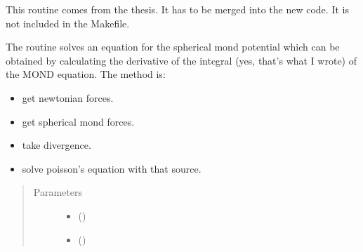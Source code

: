 \documentclass[letterpaper,10pt,english]{sphinxmanual}
\begin{document}
\begin{fulllineitems}
\label{\detokenize{sphinx-c-apidoc/output/gravity/mond_mass/solve_spherical_mond_c:c.pow6}}%
\pysigstartmultiline
{}%
\pysigstopmultiline
\end{fulllineitems}


\begin{fulllineitems}
\label{\detokenize{sphinx-c-apidoc/output/gravity/mond_mass/solve_spherical_mond_c:c.solve_spherical_mond}}%
\pysigstartmultiline
{}%
\pysigstopmultiline
This routine comes from the thesis.  It has to be merged into the new
code.  It is not included in the Makefile.

The routine solves an equation for the spherical mond potential which can
be obtained by calculating the derivative of the integral (yes, that’s
what I wrote) of the MOND equation.
The method is:
\begin{itemize}
\item {} 
get newtonian forces.

\item {} 
get spherical mond forces.

\item {} 
take divergence.

\item {} 
solve poisson’s equation with that source.

\end{itemize}
\begin{quote}\begin{description}
\item[{Parameters}] \leavevmode\begin{itemize}
\item {} 
 (\sphinxstyleliteralemphasis{\sphinxupquote{\sphinxhyphen{}}}) \textendash{} 

\item {} 
 (\sphinxstyleliteralemphasis{\sphinxupquote{\sphinxhyphen{}}}) \textendash{} 


\end{itemize}
\end{description}
\end{quote}
\end{fulllineitems}
\end{document}
